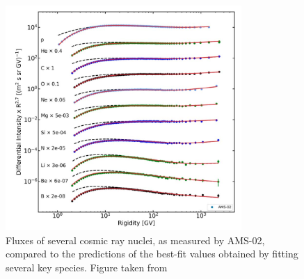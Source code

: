 \begin{figure}
    \centering
    \includegraphics[width=0.8\textwidth]{figures/Boscini_Fits.png}
    \caption{Fluxes of several cosmic ray nuclei, as measured by AMS-02, compared to the predictions of the best-fit values obtained by fitting several key species. Figure taken from \cite{Boschini:2018baj}}
    \label{fig:BosciniFits}
\end{figure}


